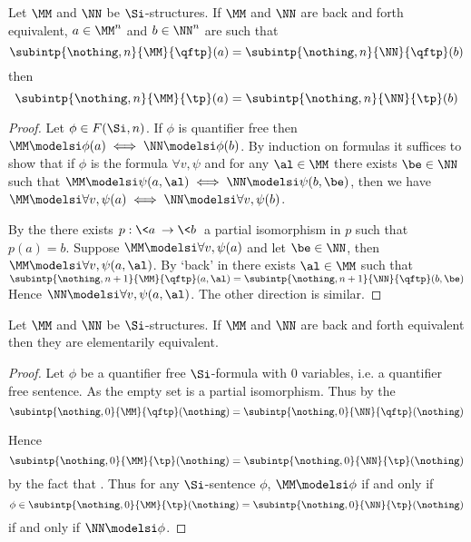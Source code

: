 \begin{lem}
    Let $\MM$ and $\NN$ be $\Si$-structures.
    If $\MM$ and $\NN$ are back and forth equivalent,
    $a \in \MM^n$ and $b \in \NN^n$ are such that
    \[\subintp{\nothing,n}{\MM}{\qftp}(a) = 
    \subintp{\nothing,n}{\NN}{\qftp}(b)\]
    then \[\subintp{\nothing,n}{\MM}{\tp}(a) = 
    \subintp{\nothing,n}{\NN}{\tp}(b)\]
\end{lem}
\begin{proof}
    Let $\phi \in F(\Si,n)$.
    If $\phi$ is quantifier free then 
    $\MM \modelsi \phi(a) \iff \NN \modelsi \phi(b)$.
    By induction on formulas it suffices to show that if 
    $\phi$ is the formula $\forall v, \psi$ and 
    for any $\al \in \MM$ there exists $\be \in \NN$ such that 
    $\MM \modelsi \psi(a,\al) \iff \NN \modelsi \psi(b,\be)$, 
    then we have 
    $\MM \modelsi \forall v, \psi(a) \iff \NN \modelsi \forall v, \psi(b)$.

    By the 
    there exists $p : \<a\> \to \<b\>$ 
    a partial isomorphism in $p$ such that $p(a) = b$.
    Suppose $\MM \modelsi \forall v, \psi(a)$ and let $\be \in \NN$, 
    then $\MM \modelsi \forall v, \psi(a,\al)$.
    By `back' in 
    there exists $\al \in \MM$ such that 
        $\subintp{\nothing,n+1}{\MM}{\qftp}(a,\al) = 
        \subintp{\nothing,n+1}{\NN}{\qftp}(b,\be)$
    Hence $\NN \modelsi \forall v, \psi(a,\al)$.
    The other direction is similar.
\end{proof}

\begin{cor}
    Let $\MM$ and $\NN$ be $\Si$-structures.
    If $\MM$ and $\NN$ are back and forth equivalent
    then they are elementarily equivalent.
\end{cor}
\begin{proof}
    Let $\phi$ be a quantifier free $\Si$-formula with $0$ variables,
    i.e. a quantifier free sentence.
    As the empty set is a partial isomorphism.
    Thus by the 
    \[\subintp{\nothing,0}{\MM}{\qftp}(\nothing) = 
    \subintp{\nothing,0}{\NN}{\qftp}(\nothing)\]
    
    Hence 
    \[\subintp{\nothing,0}{\MM}{\tp}(\nothing) = 
    \subintp{\nothing,0}{\NN}{\tp}(\nothing)\]
    by the fact that 
    .
    Thus for any $\Si$-sentence $\phi$, $\MM \modelsi \phi$ if and only if 
    \[\phi \in \subintp{\nothing,0}{\MM}{\tp}(\nothing) = 
    \subintp{\nothing,0}{\NN}{\tp}(\nothing)\]
    if and only if $\NN \modelsi \phi$.
\end{proof}


